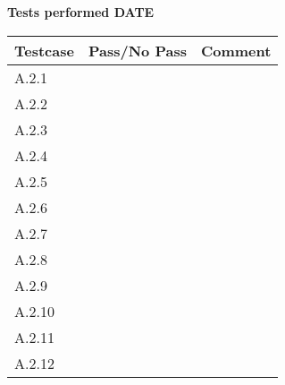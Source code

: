 \renewcommand{\testdate}{DATE}
\textbf{Tests performed \testdate}
	\begin{center}
  		\begin{tabular}{| p{3cm} | p{5cm} | p{5cm} |}
    		\hline
	    	\textbf{Testcase}			& \textbf{Pass/No Pass} 	& \textbf{Comment} \\ \hline
    		A.2.1		 						&  										&  				\\ \hline
    		A.2.2		 						&  										& 				 \\	\hline
    		A.2.3		 						&  										& 				 \\	\hline
    		A.2.4		 						&  										& 				 \\	\hline
    		A.2.5		 						&  										& 				 \\	\hline
    		A.2.6		 						&  										& 				 \\	\hline
    		A.2.7		 						&  										& 				 \\	\hline
    		A.2.8		 						&  										& 				 \\	\hline
    		A.2.9		 						&  										& 				 \\	\hline
    		A.2.10	 							&  										& 				 \\	\hline
    		A.2.11	 							&  										& 				 \\	\hline
    		A.2.12	 							&  										& 				 \\	\hline
 		 \end{tabular}
	\end{center}